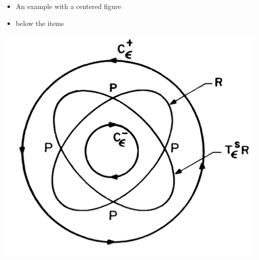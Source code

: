 \documentclass[a4,compress]{beamer}
\theoremstyle{plain}
\theoremstyle{definition}
\begin{document}

\begin{frame}
  \begin{itemize}
    \item An example with a centered figure
	\item below the items
  \end{itemize}
  \begin{center}
    \includegraphics{fixed-points}
  \end{center}
\end{frame}

\end{document}
